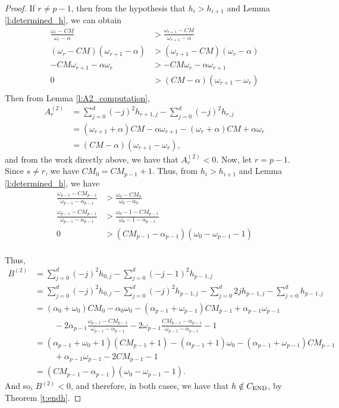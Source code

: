 \documentclass[12pt]{amsart}
\theoremstyle{definition}
\numberwithin{equation}{section}
\renewcommand\>{\rangle}
\newcommand\<{\langle}
\newcommand\0{\mathbf{0}}
\newcommand{\CEND}{C_\textnormal{END}}
\begin{document}
\begin{proof}
	If $r \neq p-1$, then from the hypothesis that $h_{i} > h_{i+1}$ and Lemma \ref{l:determined_h}, we can obtain
	\begin{align*}
		\frac{\omega_{r} -CM}{\omega_{r} - \alpha} &> \frac{\omega_{r+1} -CM}{\omega_{r+1} - \alpha}\\
		(\omega_{r} - CM)(\omega_{r+1} - \alpha) &> (\omega_{r+1} - CM)(\omega_{r} - \alpha)\\
		-CM\omega_{r+1} - \alpha \omega_{r} &> -CM\omega_{r} - \alpha \omega_{r+1}\\
		0 &> (CM-\alpha)(\omega_{r+1} - \omega_{r})\\
	\end{align*}
	Then from Lemma \ref{l:A2_computation}, 
	\begin{align*}
		A_{r}^{(2)} &= \sum_{j=0}^d (-j)^2 h_{r+1,j} - \sum_{j=0}^d (-j)^2 h_{r,j}\\
		&= (\omega_{r+1} + \alpha) CM - \alpha\omega_{r+1} - (\omega_{r} + \alpha) CM + \alpha\omega_{r}\\
		&= (CM - \alpha)(\omega_{r+1} - \omega_{r}),
	\end{align*}
	and from the work directly above, we have that $A_{r}^{(2)} < 0$. Now, let $r = p-1$. Since $s \neq r$, we have $CM_0 = CM_{p-1} + 1$. Thus, from $h_{i} > h_{i+1}$ and Lemma \ref{l:determined_h}, we have 
	\begin{align*}
		\frac{\omega_{p-1} -CM_{p-1}}{\omega_{p-1} - \alpha_{p-1}} &> \frac{\omega_{0} -CM_{0}}{\omega_{0} - \alpha_0}\\
		\frac{\omega_{p-1} -CM_{p-1}}{\omega_{p-1} - \alpha_{p-1}} &> \frac{\omega_{0} - 1 - CM_{p-1}}{\omega_{0} - 1 - \alpha_{p-1}}\\
		0 &> (CM_{p-1}-\alpha_{p-1})(\omega_{0} - \omega_{p-1} - 1)\\
	\end{align*}
	
	Thus,
	\begin{align*}
		B^{(2)} &= \sum_{j=0}^d (-j)^2 h_{0,j} - \sum_{j=0}^d (-j-1)^2 h_{p-1,j}\\
		&= \sum_{j=0}^d (-j)^2 h_{0,j} - \sum_{j=0}^d (-j)^2 h_{p-1,j} - \sum_{j=0}^d 2jh_{p-1,j} - \sum_{j=0}^d h_{p-1,j}\\
		&= (\alpha_{0} + \omega_{0})CM_{0} - \alpha_{0}\omega_{0} - (\alpha_{p-1} + \omega_{p-1})CM_{p-1} + \alpha_{p-1}\omega_{p-1}  \\
		&\phantom{=} \quad - 2\alpha_{p-1}\frac{\omega_{p-1} - CM_{p-1}}{\omega_{p-1} - \alpha_{p-1}} - 2\omega_{p-1}\frac{CM_{p-1} - \alpha_{p-1}}{\omega_{p-1} - \alpha_{p-1}} - 1  \\
		&=(\alpha_{p-1} + \omega_0 + 1)(CM_{p-1} + 1) - (\alpha_{p-1} + 1)\omega_0 - (\alpha_{p-1} + \omega_{p-1})CM_{p-1}\\
		&\phantom{=} \quad + \alpha_{p-1}\omega_{p-1}- 2CM_{p-1} - 1\\
		&= (CM_{p-1} - \alpha_{p-1})(\omega_0 - \omega_{p-1} - 1).
	\end{align*}
	And so, $B^{(2)} < 0$, and therefore, in both cases, we have that $h \notin \CEND$, by Theorem \ref{t:endh}.
\end{proof}
\end{document}
